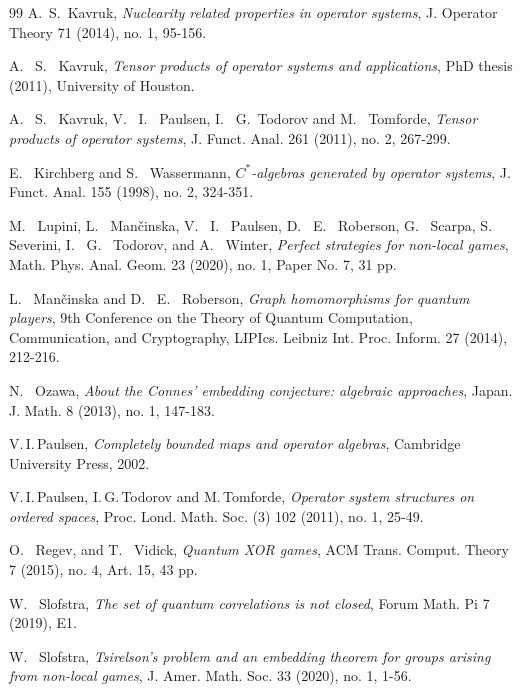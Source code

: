 \documentclass[11pt]{amsart}
\begin{document}
\begin{thebibliography}{99}
{\sc A.\, S.\, Kavruk},
{\it Nuclearity related properties in operator systems}, 
{\rm J. Operator Theory 71 (2014), no. 1, 95-156}.

{\sc A. \, S. \, Kavruk},
{\it Tensor products of operator systems and applications},
{\rm PhD thesis (2011), University of Houston}.
 

{\sc A. \, S. \, Kavruk, V. \, I. \, Paulsen, I. \, G.\, Todorov and M. \, Tomforde},
{\it Tensor products of operator systems},
{\rm J. Funct. Anal. 261 (2011), no. 2, 267-299}.

{\sc E. \, Kirchberg and S. \, Wassermann},
{\it $C^{*}$-algebras generated by operator systems},
{\rm J. Funct. Anal. 155 (1998), no. 2, 324-351.}


{\sc M. \, Lupini, L. \, Mančinska, V. \, I. \, Paulsen, D. \, E. \, Roberson, G. \, Scarpa, S. \, Severini, I. \, G. \, Todorov, and A. \, Winter},
{\it Perfect strategies for non-local games},
{\rm Math. Phys. Anal. Geom. 23 (2020), no. 1, Paper No. 7, 31 pp.}

{\sc L. \, Mančinska and D. \, E. \, Roberson},
{\it Graph homomorphisms for quantum players},
{\rm 9th Conference on the Theory of Quantum Computation, Communication, and Cryptography, LIPIcs. Leibniz Int. Proc. Inform. 27 (2014), 212-216}.

{\sc N. \, Ozawa},
{\it About the Connes' embedding conjecture: algebraic approaches},
{\rm Japan. J. Math. 8 (2013), no. 1, 147-183}.


{\sc V.\,I.\,Paulsen}, 
{\it Completely bounded maps and operator algebras}, 
{\rm Cambridge University Press, 2002}.

{\sc V.\,I.\,Paulsen, I.\,G.\,Todorov and M.\,Tomforde},
{\it Operator system structures on ordered spaces}, 
{\rm Proc. Lond. Math. Soc. (3) 102 (2011), no. 1, 25-49}.

{\sc O. \, Regev, and T. \, Vidick},
{\it Quantum XOR games},
{\rm ACM Trans. Comput. Theory 7 (2015), no. 4, Art. 15, 43 pp}.

{\sc W. \, Slofstra},
{\it The set of quantum correlations is not closed},
{\rm Forum Math. Pi 7 (2019), E1}.

{\sc W. \, Slofstra},
{\it Tsirelson's problem and an embedding theorem for groups arising from non-local games},
{\rm J. Amer. Math. Soc. 33 (2020), no. 1, 1-56}.


\end{thebibliography}
\end{document}
